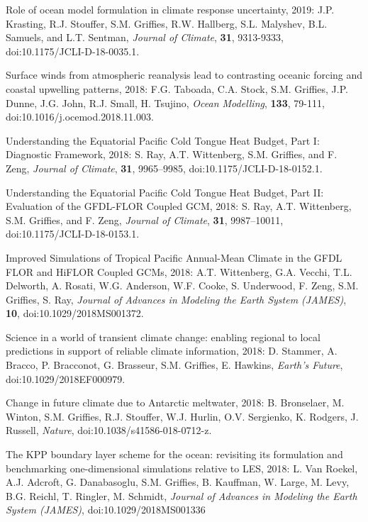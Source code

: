 \begin{etaremune}
\item Role of ocean model formulation in climate response uncertainty, 2019: J.P. Krasting, R.J. Stouffer, S.M. Grif\/f\/ies, R.W. Hallberg, S.L. Malyshev, B.L. Samuels, and L.T. Sentman, {\it Journal of Climate}, {\bf 31}, 9313-9333, doi:10.1175/JCLI-D-18-0035.1.

\item Surface winds from atmospheric reanalysis lead to contrasting oceanic forcing and coastal upwelling patterns, 2018: F.G. Taboada, C.A. Stock, S.M. Grif\/f\/ies, J.P. Dunne, J.G. John, R.J. Small, H. Tsujino, {\it Ocean Modelling}, {\bf 133}, 79-111, 
doi:10.1016/j.ocemod.2018.11.003.

\item Understanding the Equatorial Pacific Cold Tongue Heat Budget, Part I: Diagnostic Framework, 2018: S. Ray, A.T. Wittenberg, S.M. Grif\/f\/ies, and F. Zeng, {\it Journal of Climate}, {\bf 31}, 9965--9985, doi:10.1175/JCLI-D-18-0152.1. 

\item Understanding the Equatorial Pacific Cold Tongue Heat Budget, Part II: Evaluation of the GFDL-FLOR Coupled GCM, 2018: S. Ray, A.T. Wittenberg, S.M. Grif\/f\/ies, and F. Zeng, {\it Journal of Climate}, {\bf 31}, 9987--10011, doi:10.1175/JCLI-D-18-0153.1.

\item Improved Simulations of Tropical Pacific Annual-Mean Climate in the GFDL FLOR and HiFLOR Coupled GCMs, 2018:  A.T. Wittenberg, G.A. Vecchi, T.L. Delworth, A. Rosati, W.G. Anderson, W.F. Cooke, S. Underwood, F. Zeng, S.M. Grif\/f\/ies, S. Ray, {\it Journal of Advances in Modeling the Earth System (JAMES)}, {\bf 10}, doi:10.1029/2018MS001372. 

\item Science in a world of transient climate change: enabling regional to local predictions in support of reliable climate information, 2018: D. Stammer, A. Bracco, P. Bracconot, G. Brasseur, S.M. Grif\/f\/ies, E. Hawkins, {\it Earth's Future}, \\ doi:10.1029/2018EF000979.

\item Change in future climate due to Antarctic meltwater, 2018: B. Bronselaer, M. Winton, S.M. Grif\/f\/ies, R.J. Stouffer, W.J. Hurlin, O.V. Sergienko, K. Rodgers, J. Russell, {\it  Nature}, doi:10.1038/s41586-018-0712-z.

\item The KPP boundary layer scheme for the ocean: revisiting its formulation and benchmarking one-dimensional simulations relative to LES,  2018: L. Van Roekel, A.J.  Adcroft, G. Danabasoglu, S.M. Grif\/f\/ies, B. Kauffman, W. Large, M. Levy, B.G. Reichl, T. Ringler, M. Schmidt, {\it Journal of Advances in Modeling the Earth System (JAMES)}, doi:10.1029/2018MS001336


\end{etaremune}
